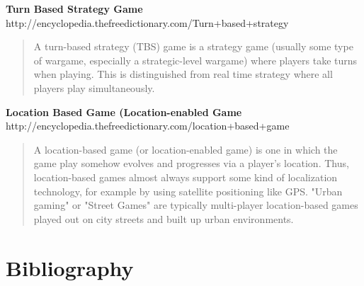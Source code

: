 \documentclass{article}
\begin{document}
\textbf{Turn Based Strategy Game}
	http://encyclopedia.thefreedictionary.com/Turn+based+strategy
\begin{quote}
A turn-based strategy (TBS) game is a strategy game (usually some type of
wargame, especially a strategic-level wargame) where players take turns when
playing. This is distinguished from real time strategy where all players play
simultaneously.
\end{quote}

\textbf{Location Based Game (Location-enabled Game}
	http://encyclopedia.thefreedictionary.com/location+based+game
\begin{quote}
A location-based game (or location-enabled game) is one in which the game play
somehow evolves and progresses via a player's location. Thus, location-based
games almost always support some kind of localization technology, for example by
using satellite positioning like GPS. "Urban gaming" or "Street Games" are
typically multi-player location-based games played out on city streets and built
up urban environments.
\end{quote}



\section{Bibliography}
		
	
\end{document}
